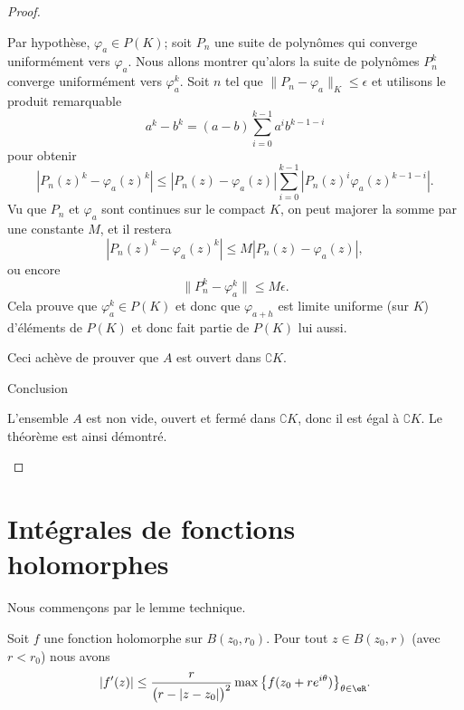 \begin{proof}
\begin{subproof}
        Par hypothèse, \( \varphi_a\in P(K)\); soit \( P_n\) une suite de polynômes qui converge uniformément vers \( \varphi_a\). Nous allons montrer qu'alors la suite de polynômes \( P_n^k\) converge uniformément vers \( \varphi_a^k\). Soit \( n\) tel que \( \| P_n-\varphi_a \|_{K}\leq \epsilon\) et utilisons le produit remarquable
        \begin{equation}
            a^k-b^k=(a-b)\sum_{i=0}^{k-1}a^ib^{k-1-i}
        \end{equation}
        pour obtenir
        \begin{equation}
            | P_n(z)^k-\varphi_a(z)^k |\leq | P_n(z)-\varphi_a(z) |\sum_{i=0}^{k-1}| P_n(z)^i\varphi_a(z)^{k-1-i} |.
        \end{equation}
        Vu que \( P_n\) et \( \varphi_a\) sont continues sur le compact \( K\), on peut majorer la somme par une constante \( M\), et il restera
        \begin{equation}
            | P_n(z)^k-\varphi_a(z)^k |\leq M | P_n(z)-\varphi_a(z) |,
        \end{equation}
        ou encore
        \begin{equation}
            \| P_n^k-\varphi_a^k \|\leq M\epsilon.
        \end{equation}
        Cela prouve que \( \varphi_a^{k}\in P(K)\) et donc que \( \varphi_{a+h}\) est limite uniforme (sur \( K\)) d'éléments de \( P(K)\) et donc fait partie de \( P(K)\) lui aussi.

        Ceci achève de prouver que \( A\) est ouvert dans \( \complement K\).
    \item[Conclusion]

        L'ensemble \( A\) est non vide, ouvert et fermé dans \( \complement K\), donc il est égal à \( \complement K\). Le théorème est ainsi démontré.
    \end{subproof}
\end{proof}

\section{Intégrales de fonctions holomorphes}

Nous commençons par le lemme technique.
\begin{lemma}       \label{LemNAnweA}
    Soit \( f\) une fonction holomorphe sur \( B(z_0,r_0)\). Pour tout \( z\in B(z_0,r)\) (avec \( r<r_0\)) nous avons
    \begin{equation}
        | f'(z) |\leq \frac{ r }{ \big( r-| z-z_0 | \big)^2 }\max\big\{ f(z_0+r e^{i\theta}) \big\}_{\theta\in \eR}.
    \end{equation}
\end{lemma}

